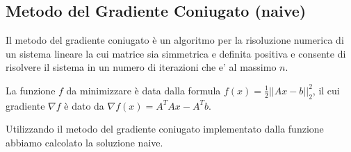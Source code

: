 \subsection{Metodo del Gradiente Coniugato (naive)}
Il metodo del gradiente coniugato è un algoritmo per la risoluzione numerica di un sistema lineare la cui matrice sia simmetrica e definita positiva
 e consente di risolvere il sistema in un numero di iterazioni che e' al massimo $n$.

La funzione $f$ da minimizzare è data dalla formula
  $f(x) = \frac{1}{2} ||Ax - b||_2^2 $, il cui gradiente $\nabla f$ è dato da
$\nabla f(x) = A^TAx - A^Tb  $.

Utilizzando il metodo del gradiente coniugato implementato dalla funzione 
 abbiamo calcolato la soluzione naive.
